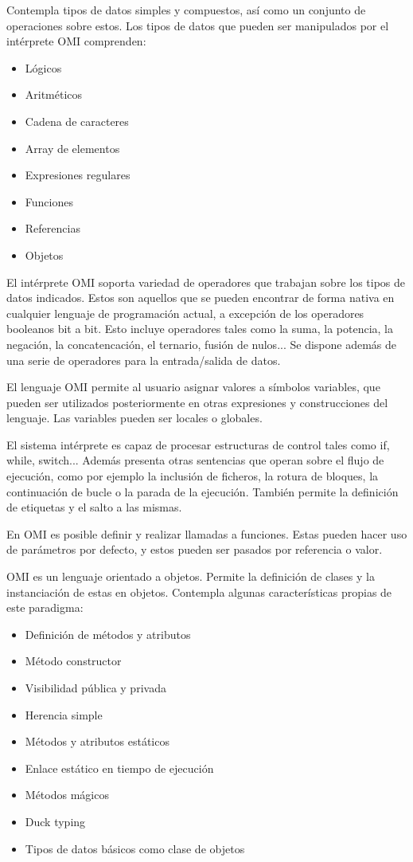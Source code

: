 Contempla tipos de datos simples y compuestos, así como un conjunto de operaciones sobre estos. Los tipos de datos que pueden ser 
manipulados por el intérprete OMI comprenden:

\begin{itemize}
  \item Lógicos
  \item Aritméticos
  \item Cadena de caracteres
  \item Array de elementos
  \item Expresiones regulares
  \item Funciones
  \item Referencias
  \item Objetos
\end{itemize}

El intérprete OMI soporta variedad de operadores que trabajan sobre los tipos de datos indicados. Estos son aquellos que se pueden encontrar de forma
nativa en cualquier lenguaje de programación actual, a excepción de los operadores booleanos bit a bit. Esto incluye operadores tales como 
la suma, la potencia, la negación, la concatencación, el ternario, fusión de nulos... Se dispone además de una serie de operadores para la entrada/salida de datos. 

El lenguaje OMI permite al usuario asignar valores a símbolos variables, que pueden ser utilizados posteriormente en otras expresiones y construcciones del lenguaje. Las 
variables pueden ser locales o globales.

El sistema intérprete es capaz de procesar estructuras de control tales como if, while, switch... Además presenta otras sentencias que operan sobre el flujo de ejecución, 
como por ejemplo la inclusión de ficheros, la rotura de bloques, la continuación de bucle o la parada de la ejecución. También permite la definición de etiquetas y el salto a las mismas.


En OMI es posible definir y realizar llamadas a funciones. Estas pueden hacer uso de parámetros por defecto, y estos pueden 
ser pasados por referencia o valor.

OMI es un lenguaje orientado a objetos. Permite la definición de clases y la instanciación de estas en objetos. Contempla algunas características 
propias de este paradigma:

\begin{itemize}
\item Definición de métodos y atributos
\item Método constructor
\item Visibilidad pública y privada
\item Herencia simple
\item Métodos y atributos estáticos
\item Enlace estático en tiempo de ejecución
\item Métodos mágicos
\item Duck typing
\item Tipos de datos básicos como clase de objetos
\end{itemize}

